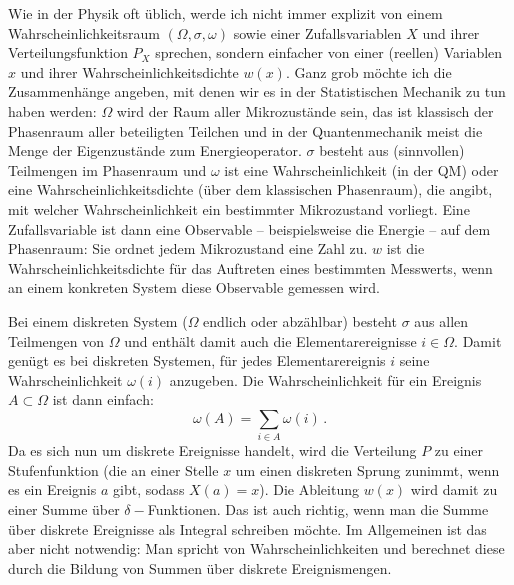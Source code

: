 Wie in der Physik oft \"ublich, werde ich nicht immer
explizit von einem Wahrscheinlichkeitsraum $(\Omega, \sigma,\omega)$ 
sowie einer Zufallsvariablen $X$ und ihrer Verteilungsfunktion
$P_X$ sprechen, sondern einfacher von einer (reellen) Variablen $x$
und ihrer Wahrscheinlichkeitsdichte $w(x)$. Ganz grob
m\"ochte ich die Zusammenh\"ange angeben, mit denen wir
es in der Statistischen Mechanik zu tun haben werden:
$\Omega$ wird der Raum aller Mikrozust\"ande sein, das
ist klassisch der Phasenraum aller beteiligten Teilchen
und in der Quantenmechanik meist die Menge der Eigenzust\"ande
zum Energieoperator. $\sigma$ besteht aus (sinnvollen)
Teilmengen im Phasenraum und $\omega$ ist eine
Wahrscheinlichkeit (in der QM) oder eine 
Wahrscheinlichkeitsdichte (\"uber dem klassischen
Phasenraum), die angibt, mit welcher
Wahrscheinlichkeit ein bestimmter Mikrozustand
vorliegt. Eine Zufallsvariable ist dann eine Observable --
beispielsweise die Energie -- auf dem Phasenraum:
Sie ordnet jedem Mikrozustand eine Zahl zu. 
$w$ ist die Wahrscheinlichkeitsdichte f\"ur das
Auftreten eines bestimmten Messwerts, wenn an einem
konkreten System diese Observable gemessen wird. 

Bei einem diskreten System ($\Omega$ endlich oder abz\"ahlbar)
besteht $\sigma$ aus allen Teilmengen von $\Omega$ und
enth\"alt damit auch die Elementarereignisse
$i\in \Omega$. Damit gen\"ugt es bei diskreten Systemen,
f\"ur jedes Elementarereignis $i$ seine Wahrscheinlichkeit
$\omega(i)$ anzugeben. Die Wahrscheinlichkeit f\"ur
ein Ereignis $A\subset \Omega$ ist dann einfach:
\begin{equation}
      \omega (A) = \sum_{i \in A} \omega(i) \, . 
\end{equation}
Da es sich nun um diskrete Ereignisse handelt,
wird die Verteilung $P$ zu einer Stufenfunktion
(die an einer Stelle $x$ um einen diskreten Sprung 
zunimmt, wenn es ein Ereignis $a$
gibt, sodass $X(a)=x$). Die Ableitung $w(x)$
wird damit zu einer Summe \"uber $\delta-$Funktionen.
Das ist auch richtig, wenn man die Summe \"uber
diskrete Ereignisse als Integral schreiben m\"ochte.
Im Allgemeinen ist das aber nicht notwendig: Man
spricht von Wahrscheinlichkeiten und berechnet
diese durch die Bildung von Summen \"uber
diskrete Ereignismengen.

